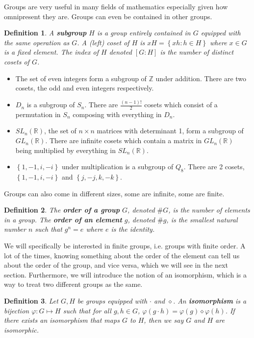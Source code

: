 \documentclass[letterpaper,12pt]{article}
\newcommand{\set}[1]{\left\{ #1 \right\}}
\newtheorem{definition}{Definition}[section]
\begin{document}
Groups are very useful in many fields of mathematics especially given how omnipresent they are. Groups can even be contained in other groups.
\begin{definition}
    A \textbf{subgroup} $H$ is a group entirely contained in $G$ equipped with the same operation as $G$. A (left) coset of $H$ is $xH = \set{xh : h \in H}$ where $x \in G$ is a fixed element. The index of $H$  denoted $[G:H]$ is the number of distinct cosets of $G$.
\end{definition}
\begin{itemize}
    \item The set of even integers form a subgroup of $\mathbb{Z}$ under addition. There are two cosets, the odd and even integers respectively.
    \item $D_n$ is a subgroup of $S_n$. There are $\frac{(n-1)!}{2}$ cosets which consist of a permutation in $S_n$ composing with everything in $D_n$.
    \item $SL_n(\mathbb{R})$, the set of $n\times n$ matrices with determinant 1, form a subgroup of $GL_n(\mathbb{R})$. There are infinite cosets which contain a matrix in $GL_n(\mathbb{R})$ being multiplied by everything in $SL_n(\mathbb{R})$.
    \item $\set{1,-1,i,-i}$ under multiplication is a subgroup of $Q_8$. There are 2 cosets, $\set{1,-1,i,-i}$ and $\set{j,-j,k,-k}$.
\end{itemize}
Groups can also come in different sizes, some are infinite, some are finite.
\begin{definition}
    The \textbf{order of a group} $G$, denoted $\# G$, is the number of elements in a group. The \textbf{order of an element} $g$, denoted $\# g$, is the smallest natural number $n$ such that $g^n = e$ where $e$ is the identity.
\end{definition} 
We will specifically be interested in finite groups, i.e. groups with finite order. A lot of the times, knowing something about the order of the element can tell us about the order of the group, and vice versa, which we will see in the next section. Furthermore, we will introduce the notion of an isomorphism, which is a way to treat two different groups as the same. \begin{definition}
    Let $G,H$ be groups equipped with $\cdot$ and $\diamond$. An \textbf{isomorphism} is a bijection $\varphi: G \mapsto H$ such that for all $g,h \in G$, $\varphi(g \cdot h) = \varphi(g) \diamond \varphi(h)$. If there exists an isomorphism that maps $G$ to $H$, then we say $G$ and $H$ are isomorphic.
\end{definition}
\end{document}
